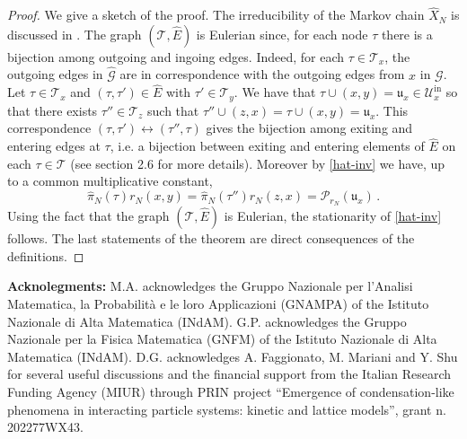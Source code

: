 \documentclass[reqno]{amsart}
\theoremstyle{plain}
\theoremstyle{definition}
\theoremstyle{remark}
\numberwithin{equation}{section}
\numberwithin{theorem}{section}
\renewcommand{\hat}{\widehat}
\newcommand{\<}{\langle}
\renewcommand{\>}{\rangle}
\begin{document}
\begin{proof}
	We give a sketch of the proof.
	The irreducibility of the Markov chain $\hat X_N$ is discussed in \cite{AT}. The graph $(\mathcal T, \hat E)$ is Eulerian since, for each node $\tau$ there is a bijection among outgoing and ingoing edges. Indeed, for each $\tau\in \mathcal T_x$, the outgoing edges in $\hat{\mathcal G}$ are in correspondence with the outgoing edges from $x$ in $\mathcal G$. Let $\tau\in \mathcal T_x$ and $(\tau,\tau')\in \hat E$ with $\tau'\in \mathcal T_y$. We have that $\tau\cup (x,y)=\mathfrak u_x\in \mathcal U^{\mathrm{in}}_x$ so that there exists $\tau''\in \mathcal T_z$ such that $\tau''\cup (z,x)= \tau\cup (x,y)=\mathfrak u_x$. This correspondence $(\tau,\tau') \leftrightarrow (\tau'',\tau)$ gives the bijection among exiting and entering edges at $\tau$, i.e. a bijection between exiting and entering elements of $\hat E$ on each $\tau\in \mathcal T$ (see \cite{BC} section 2.6 for more details). Moreover by \eqref{hat-inv} we have, up to a common multiplicative constant, 
	\begin{equation}\label{staz-tree}
		\hat\pi_N(\tau)r_N(x,y)=\hat\pi_N(\tau'')r_N(z,x)= \mathcal P_{r_N}(\mathfrak u_x)\,.
	\end{equation}
	Using the fact that the graph $(\mathcal T, \hat E)$ is Eulerian, the stationarity of \eqref{hat-inv} follows. The last statements of the theorem are direct consequences of the definitions.
\end{proof}



{\bf Acknolegments:} 
M.A. acknowledges the Gruppo Nazionale per l’Analisi Matematica, la Probabilità e le loro Applicazioni (GNAMPA) of the Istituto Nazionale di Alta Matematica (INdAM). G.P. acknowledges the Gruppo Nazionale per la Fisica Matematica (GNFM) of the Istituto Nazionale di Alta Matematica (INdAM). D.G. acknowledges A. Faggionato, M. Mariani and Y. Shu for several useful discussions and the financial support from the Italian Research Funding Agency (MIUR) through PRIN project ``Emergence of condensation-like phenomena in interacting particle systems: kinetic and lattice models'', grant n. 202277WX43.



\end{document}
